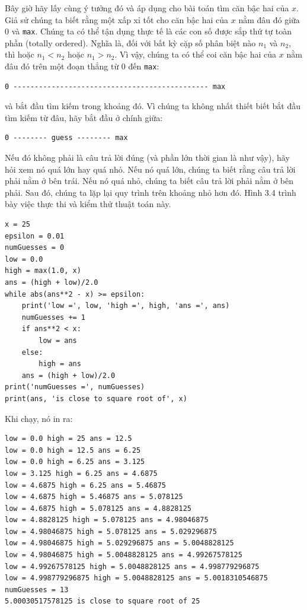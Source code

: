 Bây giờ hãy lấy cùng ý tưởng đó và áp dụng cho bài toán tìm căn bậc hai của $x$. Giả sử chúng ta biết rằng một xấp xỉ tốt cho căn bậc hai của $x$ nằm đâu đó giữa 0 và \texttt{max}. Chúng ta có thể tận dụng thực tế là các con số được sắp thứ tự toàn phần (totally ordered). Nghĩa là, đối với bất kỳ cặp số phân biệt nào $n_1$ và $n_2$, thì hoặc $n_1 < n_2$ hoặc $n_1 > n_2$. Vì vậy, chúng ta có thể coi căn bậc hai của $x$ nằm đâu đó trên một đoạn thẳng từ $0$ đến \texttt{max}:

\begin{verbatim}
0 ---------------------------------------------- max
\end{verbatim}

và bắt đầu tìm kiếm trong khoảng đó. Vì chúng ta không nhất thiết biết bắt đầu tìm kiếm từ đâu, hãy bắt đầu ở chính giữa:

\begin{verbatim}
0 -------- guess -------- max
\end{verbatim}

Nếu đó không phải là câu trả lời đúng (và phần lớn thời gian là như vậy), hãy hỏi xem nó quá lớn hay quá nhỏ. Nếu nó quá lớn, chúng ta biết rằng câu trả lời phải nằm ở bên trái. Nếu nó quá nhỏ, chúng ta biết câu trả lời phải nằm ở bên phải. Sau đó, chúng ta lặp lại quy trình trên khoảng nhỏ hơn đó. Hình 3.4 trình bày việc thực thi và kiểm thử thuật toán này.

\begin{tcolorbox}[title=Hình 3.4: Sử dụng tìm kiếm nhị phân (bisection search) để xấp xỉ căn bậc hai]

\begin{verbatim}
x = 25
epsilon = 0.01
numGuesses = 0
low = 0.0
high = max(1.0, x)
ans = (high + low)/2.0
while abs(ans**2 - x) >= epsilon:
    print('low =', low, 'high =', high, 'ans =', ans)
    numGuesses += 1
    if ans**2 < x:
        low = ans
    else:
        high = ans
    ans = (high + low)/2.0
print('numGuesses =', numGuesses)
print(ans, 'is close to square root of', x)
\end{verbatim}

\end{tcolorbox}

Khi chạy, nó in ra:

\begin{verbatim}
low = 0.0 high = 25 ans = 12.5
low = 0.0 high = 12.5 ans = 6.25
low = 0.0 high = 6.25 ans = 3.125
low = 3.125 high = 6.25 ans = 4.6875
low = 4.6875 high = 6.25 ans = 5.46875 
low = 4.6875 high = 5.46875 ans = 5.078125 
low = 4.6875 high = 5.078125 ans = 4.8828125 
low = 4.8828125 high = 5.078125 ans = 4.98046875 
low = 4.98046875 high = 5.078125 ans = 5.029296875 
low = 4.98046875 high = 5.029296875 ans = 5.0048828125 
low = 4.98046875 high = 5.0048828125 ans = 4.99267578125 
low = 4.99267578125 high = 5.0048828125 ans = 4.998779296875 
low = 4.998779296875 high = 5.0048828125 ans = 5.0018310546875
numGuesses = 13
5.00030517578125 is close to square root of 25
\end{verbatim}


